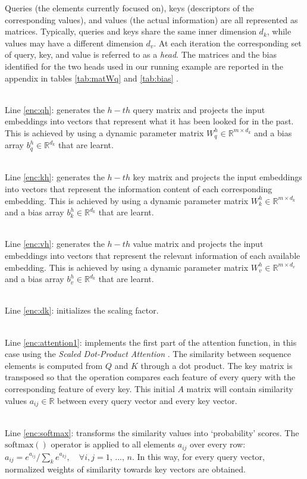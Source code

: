 \documentclass[algorithms,article,submit,pdftex,moreauthors]{Definitions/mdpi}
\begin{document}
Queries (the elements currently focused on), keys (descriptors of the corresponding values), and values (the actual information) are all represented as matrices. Typically, queries and keys share the same inner dimension $d_k$, while values may have a different dimension $d_v$. At each iteration the corresponding set of query, key, and value is referred to as a \textit{head}. The matrices and the bias identified for the two heads used in our running example are reported in the appendix in tables \ref{tab:matWq} and \ref{tab:bias} .

~\\Line \ref{enc:qh}: generates the $h-th$ query matrix and projects the input embeddings into vectors that represent what it has been looked for in the past. This is achieved by using a dynamic parameter matrix $W^h_q \in \mathbb{R}^{m \times d_k}$ and a bias array $b^h_q \in \mathbb{R}^{d_k}$ that are learnt.

~\\Line \ref{enc:kh}: generates the $h-th$ key matrix and projects the input embeddings into vectors that represent the information content of each corresponding embedding. This is achieved by using a dynamic parameter matrix $W^h_k \in \mathbb{R}^{m \times d_k}$ and a bias array $b^h_k \in \mathbb{R}^{d_k}$ that are learnt.

~\\Line \ref{enc:vh}: generates the $h-th$ value matrix and projects the input embeddings into vectors that represent the relevant information of each available embedding. This is achieved by using a dynamic parameter matrix $W^h_v \in \mathbb{R}^{m \times d_v}$ and a bias array $b^h_v \in \mathbb{R}^{d_k}$ that are learnt.

~\\Line \ref{enc:dk}: initializes the scaling factor.

~\\Line \ref{enc:attention1}: implements the first part of the attention function, in this case using the \textit{Scaled Dot-Product Attention} \cite{VSPU17}. The similarity between sequence elements is computed from $Q$ and $K$ through a dot product. The key matrix is transposed so that the operation compares each feature of every query with the corresponding feature of every key. This initial $A$ matrix will contain similarity values $a_{ij} \in \mathbb{R}$ between every query vector and every key vector. 

~\\Line \ref{enc:softmax}: transforms the similarity values into `probability' scores. The $\text{softmax}()$ operator is applied to all elements $a_{ij}$ over every row: $a_{ij} = e^{a_{ij}} / \sum_k e^{a_{kj}},\quad \forall i,j  = 1,\,...,\,n $. In this way, for every query vector, normalized weights of similarity towards key vectors are obtained. 
\end{document}

